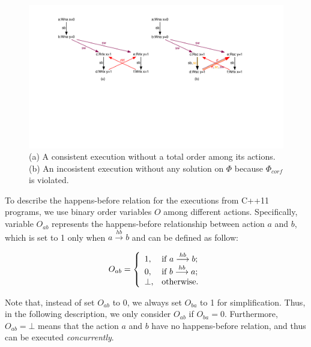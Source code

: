 \documentclass[preprint, numbers, 10pt]{sigplanconf}
\begin{document}
\begin{figure}%
\centering\includegraphics[scale=0.34]{noStrictOrder.pdf} %
\caption{(a) A consistent execution without a total order among
its actions. (b) An incosistent execution without any solution
on $\Phi$ because $\Phi_{corf}$ is violated. }
\label{fig:noStrictOrder}
\end{figure}

To describe the happens-before relation for the executions from C++11 programs, 
we use binary order variables $O$ among different actions.
Specifically, variable $O_{ab}$ represents the happens-before
relationship between action $a$ and $b$, which is set to 1 only when 
$a \stackrel{hb}{\longrightarrow} b$ and 
can be defined as follow: 

\[ O_{ab} = \left\{
  \begin{array}{l l}
    1,           &  {\text{if $a \stackrel{hb}{\longrightarrow} b$}};\\
    0,           &  {\text{if $b \stackrel{hb}{\longrightarrow} a$}};\\
    \bot,  &  \text{otherwise}.
  \end{array} \right.\]

Note that, instead of set $O_{ab}$ to 0, we always set $O_{ba}$ to 1 for simplification. 
Thus, in the following description, we only consider $O_{ab}$ if $O_{ba}=0$. 
Furthermore, $O_{ab}=\bot$ means that the action $a$ and $b$
have no happens-before relation, and thus can be executed \textit{concurrently}.   
\end{document}
